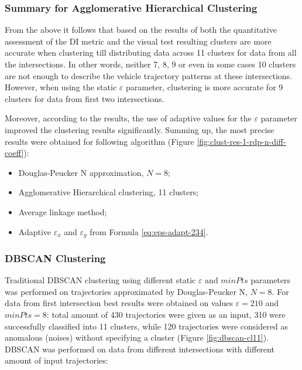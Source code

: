 \subsubsection{Summary for Agglomerative Hierarchical Clustering}

From the above it follows that based on the results of both the quantitative assessment of the DI metric and the visual test resulting clusters are more accurate when clustering till distributing data across 11 clusters for data from all the intersections. In other words, neither 7, 8, 9 or even in some cases 10 clusters are not enough to describe the vehicle trajectory patterns at these intersections. However, when using the static $\varepsilon$ parameter, clustering is more accurate for 9 clusters for data from first two intersections.

Moreover, according to the results, the use of adaptive values for the $\varepsilon$ parameter improved the clustering results significantly. Summing up, the most precise results were obtained for following algorithm (Figure \ref{fig:clust-res-1-rdp-n-diff-coeff}):

\begin{itemize}
	\setlength\itemsep{0em}
	\item Douglas-Peucker N approximation, $N = 8$;
	\item Agglomerative Hierarchical clustering, 11 clusters;
	\item Average linkage method;
	\item Adaptive $\varepsilon_x$ and $\varepsilon_y$ from Formula \ref{eq:eps-adapt-234}.
\end{itemize}

\subsubsection{DBSCAN Clustering}

Traditional DBSCAN clustering using different static $\varepsilon$ and $minPts$ parameters was performed on trajectories approximated by Douglas-Peucker N, $N = 8$. For data from first intersection best results were obtained on values $\varepsilon = 210$ and $minPts= 8$: total amount of 430 trajectories were given as an input, 310 were successfully classified into 11 clusters, while 120 trajectories were considered as anomalous (noises) without specifying a cluster (Figure \ref{fig:dbscan-cl11}). DBSCAN was performed on data from different intersections with different amount of input trajectories: 

